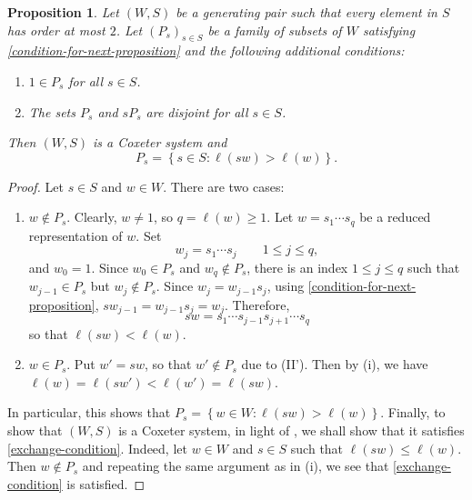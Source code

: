 \documentclass{article}
\theoremstyle{thmstyle}
\newtheorem{proposition}[theorem]{Proposition}
\theoremstyle{defstyle}
\renewcommand{\le}{\leqslant}
\renewcommand{\ge}{\geqslant}
\begin{document}
\begin{proposition}
    Let $(W, S)$ be a generating pair such that every element in $S$ has order at most $2$. Let $(P_s)_{s\in S}$ be a family of subsets of $W$ satisfying \ref{condition-for-next-proposition} and the following additional conditions: 
    \begin{enumerate}[label=(\Roman*')]
        \item $1\in P_s$ for all $s\in S$. \label{one-dash}
        \item The sets $P_s$ and $sP_s$ are disjoint for all $s\in S$. \label{two-dash}
    \end{enumerate}
    Then $(W, S)$ is a Coxeter system and 
    \begin{equation*}
        P_s = \left\{s\in S\colon \ell(sw) > \ell(w)\right\}.
    \end{equation*}
\end{proposition}
\begin{proof}
    Let $s\in S$ and $w\in W$. There are two cases: 
    \begin{enumerate}[label=(\roman*)]
        \item $w\notin P_s$. Clearly, $w\ne 1$, so $q = \ell(w)\ge 1$. Let $w = s_1\cdots s_q$ be a reduced representation of $w$. Set 
        \begin{equation*}
            w_j = s_1\cdots s_j\qquad 1\le j\le q,
        \end{equation*}
        and $w_0 = 1$. Since $w_0\in P_s$ and $w_q\notin P_s$, there is an index $1\le j\le q$ such that $w_{j - 1}\in P_s$ but $w_j\notin P_s$. Since $w_j = w_{j - 1}s_j$, using \ref{condition-for-next-proposition}, $sw_{j - 1} = w_{j - 1}s_j = w_j$. Therefore, 
        \begin{equation*}
            sw = s_1\cdots s_{j - 1}s_{j + 1}\cdots s_q
        \end{equation*}
        so that $\ell(sw) < \ell(w)$.

        \item $w\in P_s$. Put $w'= sw$, so that $w'\notin P_s$ due to (II'). Then by (i), we have $\ell(w) = \ell(sw') < \ell(w') = \ell(sw)$.
    \end{enumerate}
    In particular, this shows that $P_s = \left\{w\in W\colon \ell(sw) > \ell(w)\right\}$. Finally, to show that $(W, S)$ is a Coxeter system, in light of , we shall show that it satisfies \ref{exchange-condition}. Indeed, let $w\in W$ and $s\in S$ such that $\ell(sw)\le\ell(w)$. Then $w\notin P_s$ and repeating the same argument as in (i), we see that \ref{exchange-condition} is satisfied.
\end{proof}
\end{document}
